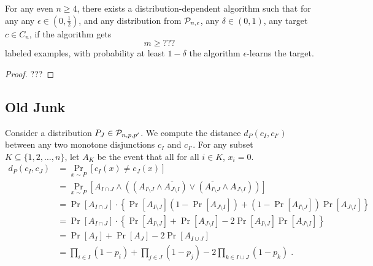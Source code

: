\begin{theorem}
For any even $n \ge 4$, there exists a distribution-dependent algorithm
such that for any any $\epsilon \in (0,\frac{1}{2})$, and any distribution from $\P_{n,\epsilon}$,
any $\delta \in (0,1)$, any target $c \in C_n$, if the algorithm gets
$$
m \ge ???
$$
labeled examples, with probability at least $1-\delta$ the algorithm $\epsilon$-learns the target.
\end{theorem}

\begin{proof}
???
\end{proof}


\subsection{Old Junk}

Consider a distribution $P_J \in \P_{n,p,p'}$. We compute the distance $d_P(c_I, c_{I'})$ between
any two monotone disjunctions $c_I$ and $c_{I'}$. For any subset $K \subseteq \{1,2,\dots,n\}$, let
$A_K$ be the event that all for all $i \in K$, $x_i = 0$.
\begin{align*}
d_P(c_I, c_J)
& = \Pr_{x \sim P}[c_I(x) \neq c_J(x)] \\
& = \Pr_{x \sim P}[A_{I \cap J} \wedge ((A_{I \setminus J} \wedge \overline{A_{J \setminus I}}) \vee (\overline{A_{I \setminus J}} \wedge A_{J \setminus I} )) ] \\
& = \Pr[A_{I \cap J}] \cdot \left\{ \Pr[A_{I \setminus J}] (1 - \Pr[A_{J \setminus I}]) + (1 - \Pr[A_{I \setminus J}]) \Pr[A_{J \setminus I}] \right\} \\
& = \Pr[A_{I \cap J}] \cdot \left\{ \Pr[A_{I \setminus J}] + \Pr[A_{J \setminus I}] - 2 \Pr[A_{I \setminus J}] \Pr[A_{J \setminus I}] \right\} \\
& = \Pr[A_I] + \Pr[A_J] - 2 \Pr[A_{I \cup J}] \\
& = \prod_{i \in I} (1 - p_i) + \prod_{j \in J} (1 - p_j) - 2 \prod_{k \in I \cup J} (1 - p_k) \; . \\
\end{align*}

